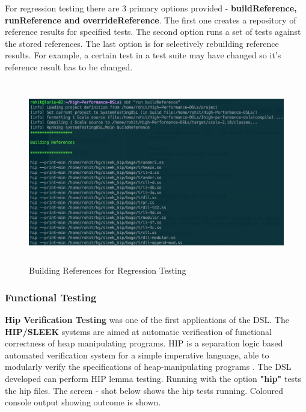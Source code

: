 \noindent
For regression testing there are 3 primary options provided  - \textbf{buildReference, runReference and overrideReference}. The first one creates a repository of reference results for specified tests. The second option runs a set of tests against the stored references. The last option is for selectively rebuilding reference results. For example, a certain test in a test suite may have changed so it's reference result has to be changed.
\bigskip

\begin{figure}[H]
  \centering
    \includegraphics[height=300px]{figures/building_reference.png}
  \caption{Building References for Regression Testing}
\end{figure}

\subsubsection{Functional Testing}
\textbf{Hip Verification Testing} was one of the first applications of the DSL. The \textbf{HIP/SLEEK} systems are aimed at automatic verification of functional correctness of heap manipulating programs. HIP is a separation logic based automated verification system for a simple imperative language, able to modularly verify the specifications of heap-manipulating programs \cite{hipsleek}. The DSL developed can perform HIP lemma testing. Running with the option \textbf{"hip"} tests the hip files. The screen - shot below shows the hip tests running. Coloured console output showing outcome is shown.
\bigskip

